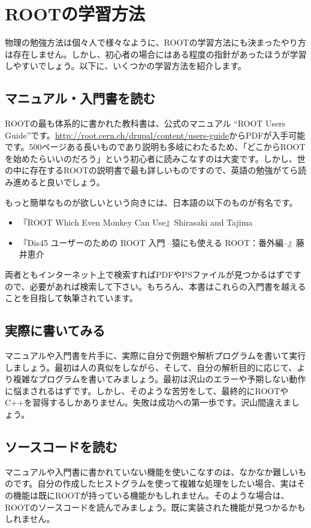 \section{ROOTの学習方法}
物理の勉強方法は個々人で様々なように、ROOTの学習方法にも決まったやり方は存在しません。しかし、初心者の場合にはある程度の指針があったほうが学習しやすいでしょう。以下に、いくつかの学習方法を紹介します。
\subsection{マニュアル・入門書を読む}
ROOTの最も体系的に書かれた教科書は、公式のマニュアル ``ROOT Users Guide''です。\url{http://root.cern.ch/drupal/content/users-guide}からPDFが入手可能です。500ページある長いものであり説明も多岐にわたるため、「どこからROOTを始めたらいいのだろう」という初心者に読みこなすのは大変です。しかし、世の中に存在するROOTの説明書で最も詳しいものですので、英語の勉強がてら読み進めると良いでしょう。

もっと簡単なものが欲しいという向きには、日本語の以下のものが有名です。
\begin{itemize}
  \item 『ROOT Which Even Monkey Can Use』Shirasaki and Tajima
  \item 『Dis45 ユーザーのための ROOT 入門 --猿にも使える ROOT：番外編--』藤井恵介
\end{itemize}
両者ともインターネット上で検索すればPDFやPSファイルが見つかるはずですので、必要があれば検索して下さい。もちろん、本書はこれらの入門書を越えることを目指して執筆されています。

\subsection{実際に書いてみる}

マニュアルや入門書を片手に、実際に自分で例題や解析プログラムを書いて実行しましょう。最初は人の真似をしながら、そして、自分の解析目的に応じて、より複雑なプログラムを書いてみましょう。最初は沢山のエラーや予期しない動作に悩まされるはずです。しかし、そのような苦労をして、最終的にROOTやC++を習得するしかありません。失敗は成功への第一歩です。沢山間違えましょう。

\subsection{ソースコードを読む}

マニュアルや入門書に書かれていない機能を使いこなすのは、なかなか難しいものです。自分の作成したヒストグラムを使って複雑な処理をしたい場合、実はその機能は既にROOTが持っている機能かもしれません。そのような場合は、ROOTのソースコードを読んでみましょう。既に実装された機能が見つかるかもしれません。

